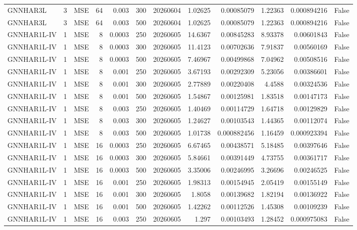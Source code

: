 \begin{tabular}{lrlrrrrrrrrr}
GNNHAR3L & 3 & MSE & 64 & 0.003 & 300 & 20260604 & 1.02625 & 0.00085079 & 1.22363 & 0.000894216 & False \\
GNNHAR3L & 3 & MSE & 64 & 0.003 & 500 & 20260604 & 1.02625 & 0.00085079 & 1.22363 & 0.000894216 & False \\
GNNHAR1L-IV & 1 & MSE & 8 & 0.0003 & 250 & 20260605 & 14.6367 & 0.00845283 & 8.93378 & 0.00601843 & False \\
GNNHAR1L-IV & 1 & MSE & 8 & 0.0003 & 300 & 20260605 & 11.4123 & 0.00702636 & 7.91837 & 0.00560169 & False \\
GNNHAR1L-IV & 1 & MSE & 8 & 0.0003 & 500 & 20260605 & 7.46967 & 0.00499868 & 7.04962 & 0.00508516 & False \\
GNNHAR1L-IV & 1 & MSE & 8 & 0.001 & 250 & 20260605 & 3.67193 & 0.00292309 & 5.23056 & 0.00386601 & False \\
GNNHAR1L-IV & 1 & MSE & 8 & 0.001 & 300 & 20260605 & 2.77889 & 0.00220408 & 4.4588 & 0.00324536 & False \\
GNNHAR1L-IV & 1 & MSE & 8 & 0.001 & 500 & 20260605 & 1.54867 & 0.00125981 & 1.83518 & 0.00147173 & False \\
GNNHAR1L-IV & 1 & MSE & 8 & 0.003 & 250 & 20260605 & 1.40469 & 0.00114729 & 1.64718 & 0.00129829 & False \\
GNNHAR1L-IV & 1 & MSE & 8 & 0.003 & 300 & 20260605 & 1.24627 & 0.00103543 & 1.44365 & 0.00112074 & False \\
GNNHAR1L-IV & 1 & MSE & 8 & 0.003 & 500 & 20260605 & 1.01738 & 0.000882456 & 1.16459 & 0.000923394 & False \\
GNNHAR1L-IV & 1 & MSE & 16 & 0.0003 & 250 & 20260605 & 6.67465 & 0.00438571 & 5.18485 & 0.00397646 & False \\
GNNHAR1L-IV & 1 & MSE & 16 & 0.0003 & 300 & 20260605 & 5.84661 & 0.00391449 & 4.73755 & 0.00361717 & False \\
GNNHAR1L-IV & 1 & MSE & 16 & 0.0003 & 500 & 20260605 & 3.35006 & 0.00246995 & 3.26696 & 0.00246525 & False \\
GNNHAR1L-IV & 1 & MSE & 16 & 0.001 & 250 & 20260605 & 1.98313 & 0.00154945 & 2.05419 & 0.00155149 & False \\
GNNHAR1L-IV & 1 & MSE & 16 & 0.001 & 300 & 20260605 & 1.8058 & 0.00139682 & 1.82194 & 0.00136922 & False \\
GNNHAR1L-IV & 1 & MSE & 16 & 0.001 & 500 & 20260605 & 1.42262 & 0.00112526 & 1.45308 & 0.00109239 & False \\
GNNHAR1L-IV & 1 & MSE & 16 & 0.003 & 250 & 20260605 & 1.297 & 0.00103493 & 1.28452 & 0.000975083 & False \\

\end{tabular}
